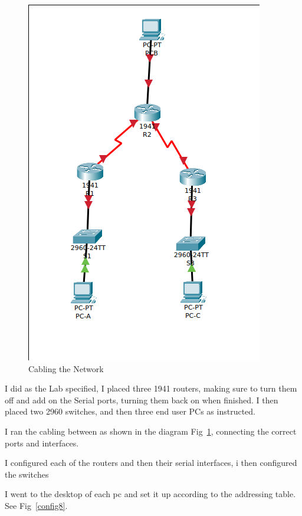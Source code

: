 \documentclass[../EngineeringJournal_CDavis.tex]{subfiles}
\begin{document}
\newpage


\begin{figure}
\centering
    \includegraphics[width=.48\textwidth]{Figures/2020-01-31-112732_392x603_scrot.png}
  \caption{Cabling the Network}
  \label{cable8}
\end{figure}

\hfill\break
\hfill\break
I did as the Lab specified, I placed three 1941 routers, making sure to turn them off and add on the Serial ports, turning them back on when finished. I then placed two 2960 switches, and then three end user PCs as instructed.
\hfill\break

\noindent{}
I ran the cabling between as shown in the diagram Fig~\ref{cable8}, connecting the correct ports and interfaces.
\hfill\break

\noindent{}
I configured each of the routers and then their serial interfaces, i then configured the switches
\hfill\break

\noindent{}
I went to the desktop of each pc and set it up according to the addressing table. See
Fig~\ref{config8}.
\hfill\break
\end{document}
